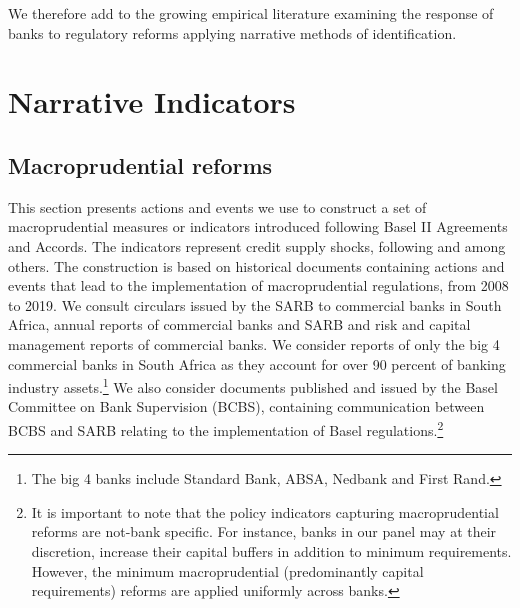 \documentclass[
  letterpaper,
  DIV=11,
  numbers=noendperiod]{scrartcl}
\begin{document}
We therefore add to the growing empirical literature examining the
response of banks to regulatory reforms applying narrative methods of
identification.

\section{Narrative Indicators}\label{narrative-indicators}

\subsection{Macroprudential reforms}\label{macroprudential-reforms}

This section presents actions and events we use to construct a set of
macroprudential measures or indicators introduced following Basel II
Agreements and Accords. The indicators represent credit supply shocks,
following \cite{noss2016estimating} and \cite{deli2017real} among
others. The construction is based on historical documents containing
actions and events that lead to the implementation of macroprudential
regulations, from 2008 to 2019. We consult circulars issued by the SARB
to commercial banks in South Africa, annual reports of commercial banks
and SARB and risk and capital management reports of commercial banks. We
consider reports of only the big 4 commercial banks in South Africa as
they account for over 90 percent of banking industry
assets.\footnote{The big 4 banks include Standard Bank, ABSA, Nedbank and First Rand.}
We also consider documents published and issued by the Basel Committee
on Bank Supervision (BCBS), containing communication between BCBS and
SARB relating to the implementation of Basel regulations.\footnote{It is
  important to note that the policy indicators capturing macroprudential
  reforms are not-bank specific. For instance, banks in our panel may at
  their discretion, increase their capital buffers in addition to
  minimum requirements. However, the minimum macroprudential
  (predominantly capital requirements) reforms are applied uniformly
  across banks.}
\end{document}
